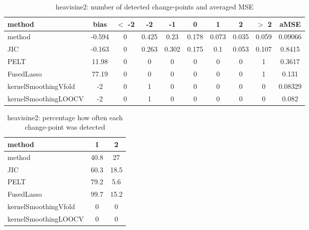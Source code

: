\begin{table}[ht]
\centering
\begin{tabular}{l|c|ccccccc|c}
  \hline
method & bias & $<$ -2 & -2 & -1 & 0 & 1 & 2 & $>$ 2 & aMSE \\ 
  \hline
method & -0.594 &     0 & 0.425 &  0.23 & 0.178 & 0.073 & 0.035 & 0.059 & 0.09066 \\ 
  JIC & -0.163 &     0 & 0.263 & 0.302 & 0.175 &   0.1 & 0.053 & 0.107 & 0.8415 \\ 
  PELT & 11.98 &     0 &     0 &     0 &     0 &     0 &     0 &     1 & 0.3617 \\ 
  FusedLasso & 77.19 &     0 &     0 &     0 &     0 &     0 &     0 &     1 & 0.131 \\ 
  kernelSmoothingVfold &    -2 &     0 &     1 &     0 &     0 &     0 &     0 &     0 & 0.08329 \\ 
  kernelSmoothingLOOCV &    -2 &     0 &     1 &     0 &     0 &     0 &     0 &     0 & 0.082 \\ 
   \hline
\end{tabular}
\caption{heavisine2: number of detected change-points and averaged MSE} 
\label{tab:heavisine2Njumps}
\end{table}
\begin{table}[ht]
\centering
\begin{tabular}{l|cc}
  \hline
method & 1 & 2 \\ 
  \hline
method &   40.8 &     27 \\ 
  JIC &   60.3 &   18.5 \\ 
  PELT &   79.2 &    5.6 \\ 
  FusedLasso &   99.7 &   15.2 \\ 
  kernelSmoothingVfold &      0 &      0 \\ 
  kernelSmoothingLOOCV &      0 &      0 \\ 
   \hline
\end{tabular}
\caption{heavisine2: percentage how often each change-point was detected} 
\label{tab:heavisine2Detections}
\end{table}
